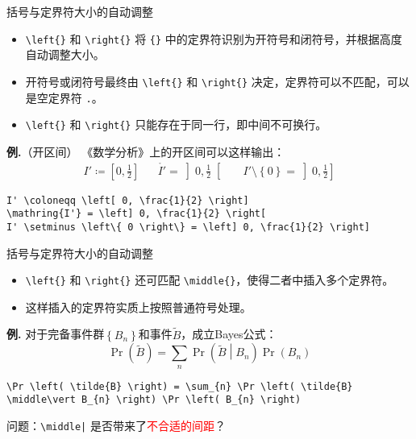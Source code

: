 \documentclass[mathserif]{beamer}
\newcommand{\red}[1]{\textcolor{red}{#1}}
\newcommand{\codegreen}[1]{\textcolor{codegreen}{#1}}
\newenvironment{instance}{\zihao{-5}\textbf{\songti \codegreen{例.}}}{\hfill\par}
\begin{document}
\begin{frame}[fragile]{括号与定界符}{大小的自动调整}
\begin{itemize}

\item \lstinline'\left{}' 和 \lstinline'\right{}' 将 \lstinline'{}' 中的定界符识别为开符号和闭符号，并根据高度自动调整大小。

\item 开符号或闭符号最终由 \lstinline'\left{}' 和 \lstinline'\right{}' 决定，定界符可以不匹配，可以是空定界符 \lstinline'.'。

\item \lstinline'\left{}' 和 \lstinline'\right{}' 只能存在于同一行，即中间不可换行。

\end{itemize}

\begin{instance}（开区间）
	《数学分析》上的开区间可以这样输出：
\begin{equation*}
	\begin{aligned}
	I' \coloneqq \left[ 0, \frac{1}{2} \right] &&
	\mathring{I'} = \left] 0, \frac{1}{2} \right[ &&
	I' \setminus \left\{ 0 \right\} = \left] 0, \frac{1}{2} \right]
	\end{aligned}
\end{equation*}
\begin{lstlisting}[numbers=none]
I' \coloneqq \left[ 0, \frac{1}{2} \right]
\mathring{I'} = \left] 0, \frac{1}{2} \right[
I' \setminus \left\{ 0 \right\} = \left] 0, \frac{1}{2} \right]
\end{lstlisting}
\end{instance}
\end{frame}

\begin{frame}[fragile]{括号与定界符}{大小的自动调整}
\begin{itemize}

\item \lstinline'\left{}' 和 \lstinline'\right{}' 还可匹配 \lstinline'\middle{}'，使得二者中插入多个定界符。

\item 这样插入的定界符实质上按照普通符号处理。

\end{itemize}
\begin{instance}
	对于完备事件群$\left\{ B_{n} \right\}$和事件$\tilde{B}$，成立Bayes公式：
\begin{equation*}
	\Pr \left( \tilde{B} \right) = \sum_{n} \Pr \left( \tilde{B} \middle\vert B_{n} \right) \Pr \left( B_{n} \right)
\end{equation*}
\begin{lstlisting}[numbers=none]
\Pr \left( \tilde{B} \right) = \sum_{n} \Pr \left( \tilde{B} \middle\vert B_{n} \right) \Pr \left( B_{n} \right)
\end{lstlisting}
\end{instance}
问题：\lstinline'\middle|' 是否带来了\red{不合适的间距}？
\end{frame}
\end{document}
